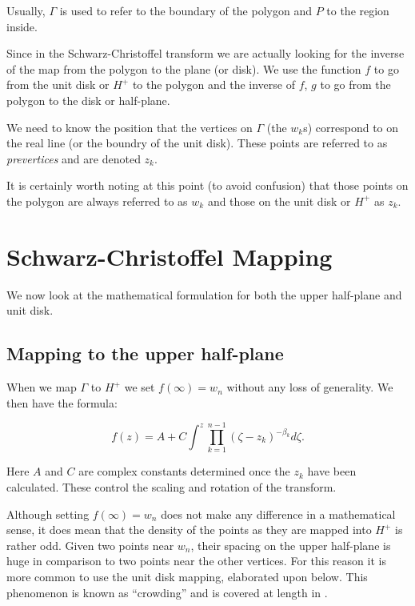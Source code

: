 \documentclass[a4paper,10pt]{amsart}
\newcommand{\sch}{Schwarz-Christoffel }
\begin{document}
Usually, $\Gamma$ is used to refer to the boundary of the polygon and $P$ to the region inside.

Since in the \sch transform we are actually looking for the inverse of the map from the polygon to the plane (or disk). We use the function $f$ to go from the unit disk or $H^+$ to the polygon and the inverse of $f$, $g$ to go from the polygon to the disk or half-plane.  

We need to know the position that the vertices on $\Gamma$ (the $w_k$s) correspond to on the real line (or the boundry of the unit disk). These points are referred to as \emph{prevertices} and are denoted $z_k$.

It is certainly worth noting at this point (to avoid confusion) that those points on the polygon are always referred to as $w_k$ and those on the unit disk or $H^+$ as $z_k$. 

 
\section{\sch Mapping}

We now look at the mathematical formulation for both the upper half-plane and unit disk.

\subsection{Mapping to the upper half-plane}

When we map $\Gamma$ to $H^+$ we set $f(\infty) = w_n$ without any loss of generality. We then have the formula:

\begin{equation}
f(z) = A + C \int^z \prod_{k=1}^{n-1} (\zeta-z_k)^{-\beta_k} d\zeta.
\end{equation}

Here $A$ and $C$ are complex constants determined once the $z_k$ have been calculated. These control the scaling and rotation of the transform.

Although setting $f(\infty) = w_n$ does not make any difference in a mathematical sense, it does mean that the density of the points as they are mapped into $H^+$ is rather odd. Given two points near $w_n$, their spacing on the upper half-plane is huge in comparison to two points near the other vertices. For this reason it is more common to use the unit disk mapping, elaborated upon below. This phenomenon is known as ``crowding'' and is covered at length in \cite{driscoll}. 
\end{document}
